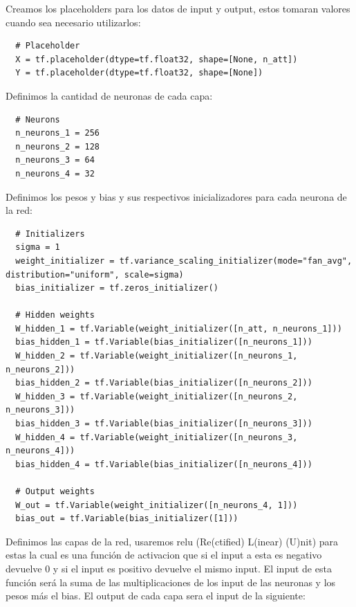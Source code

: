 \documentclass[osajnl,twocolumn,showpacs,superscriptaddress,10pt]{revtex4-1} %
\begin{document}
Creamos los placeholders para los datos de input y output, estos tomaran valores cuando sea necesario utilizarlos:

\begin{verbatim}
  # Placeholder
  X = tf.placeholder(dtype=tf.float32, shape=[None, n_att])
  Y = tf.placeholder(dtype=tf.float32, shape=[None])
\end{verbatim}

Definimos la cantidad de neuronas de cada capa:

\begin{verbatim}
  # Neurons
  n_neurons_1 = 256
  n_neurons_2 = 128
  n_neurons_3 = 64
  n_neurons_4 = 32
\end{verbatim}

Definimos los pesos y bias y sus respectivos inicializadores para cada neurona de la red:

\begin{verbatim}
  # Initializers
  sigma = 1
  weight_initializer = tf.variance_scaling_initializer(mode="fan_avg", distribution="uniform", scale=sigma)
  bias_initializer = tf.zeros_initializer()

  # Hidden weights
  W_hidden_1 = tf.Variable(weight_initializer([n_att, n_neurons_1]))
  bias_hidden_1 = tf.Variable(bias_initializer([n_neurons_1]))
  W_hidden_2 = tf.Variable(weight_initializer([n_neurons_1, n_neurons_2]))
  bias_hidden_2 = tf.Variable(bias_initializer([n_neurons_2]))
  W_hidden_3 = tf.Variable(weight_initializer([n_neurons_2, n_neurons_3]))
  bias_hidden_3 = tf.Variable(bias_initializer([n_neurons_3]))
  W_hidden_4 = tf.Variable(weight_initializer([n_neurons_3, n_neurons_4]))
  bias_hidden_4 = tf.Variable(bias_initializer([n_neurons_4]))

  # Output weights
  W_out = tf.Variable(weight_initializer([n_neurons_4, 1]))
  bias_out = tf.Variable(bias_initializer([1]))
\end{verbatim}

Definimos las capas de la red, usaremos relu (Re(ctified) L(inear) (U)nit) para estas la cual es una función de activacion que si el input a esta es negativo devuelve 0 y si el input es positivo devuelve el mismo input. El input de esta función será la suma de las multiplicaciones de los input de las neuronas y los pesos más el bias. El output de cada capa sera el input de la siguiente:
\end{document}
